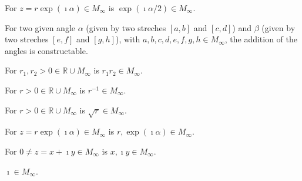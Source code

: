 \begin{lemma}
    \label{lem:construction_halving_angle}
    For $z = r \exp(\imath \alpha) \in M_{\infty}$ is $\exp(\imath \alpha / 2) \in M_{\infty}$.
\end{lemma}


\begin{lemma}
    \label{lem:construction_add_angle}
    For two given angle $\alpha$ (given by two streches $[a,b]$ and $[c,d]$) and $\beta$ (given by two streches $[e,f]$ and $[g,h]$), with $ a,b,c,d,e,f,g,h \in M_{\infty}$, the addition of the angles is constructable.
\end{lemma}

\begin{lemma}
    \label{lem:construction_mult_pos_real}
    For $r_1, r_2 > 0 \in \mathbb{R}\cup M_{\infty}$ is $r_1 r_2 \in M_{\infty}$.
\end{lemma}

\begin{lemma}
    \label{lem:construction_inv_pos_real}
    For $r > 0\in \mathbb{R}\cup M_{\infty}$ is $r^{-1} \in M_{\infty}$.
\end{lemma}

\begin{lemma}
    \label{lem:construction_sqrt_pos_real}
    For $r > 0 \in \mathbb{R}\cup M_{\infty}$ is $\sqrt{r} \in M_{\infty}$.
\end{lemma}

\begin{lemma}
    \label{lem:construction_polar}
    For $z = r \exp(\imath \alpha) \in M_{\infty}$ is $r, \allowbreak \exp(\imath \alpha) \in M_{\infty}$.
\end{lemma}

\begin{lemma}
    \label{lem:construction_re_im}
    For $0 \ne z = x + \imath y \in M_{\infty}$ is $x, \imath y \in M_{\infty}$.
\end{lemma}

\begin{lemma}
    \label{lem:construction_imath}
    $\imath \in M_{\infty}$.
\end{lemma}
